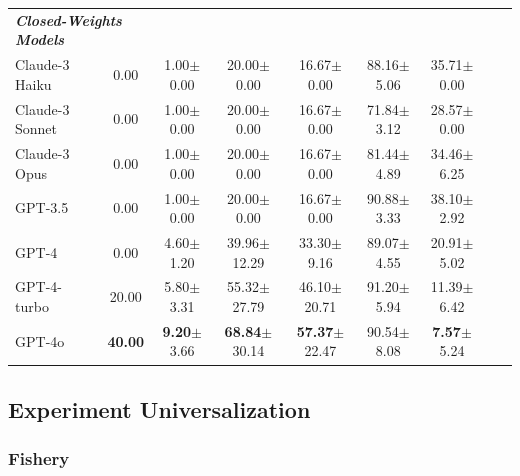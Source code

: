 \documentclass{article}
\newcommand{\fishScenarioFull}{Fishery\xspace}
\begin{document}
\begin{table}[h]
\begin{tabular}{lcccccccc}
\midrule
\multicolumn{2}{l}{\textbf{\textit{Closed-Weights Models}}}\\
Claude-3 Haiku & 0.00 & 1.00\tiny{$\pm$0.00} & 20.00\tiny{$\pm$0.00} & 16.67\tiny{$\pm$0.00} & 88.16\tiny{$\pm$5.06} & 35.71\tiny{$\pm$0.00} \\
Claude-3 Sonnet & 0.00 & 1.00\tiny{$\pm$0.00} & 20.00\tiny{$\pm$0.00} & 16.67\tiny{$\pm$0.00} & 71.84\tiny{$\pm$3.12} & 28.57\tiny{$\pm$0.00} \\
Claude-3 Opus & 0.00 & 1.00\tiny{$\pm$0.00} & 20.00\tiny{$\pm$0.00} & 16.67\tiny{$\pm$0.00} & 81.44\tiny{$\pm$4.89} & 34.46\tiny{$\pm$6.25} \\
GPT-3.5 & 0.00 & 1.00\tiny{$\pm$0.00} & 20.00\tiny{$\pm$0.00} & 16.67\tiny{$\pm$0.00} & 90.88\tiny{$\pm$3.33} & 38.10\tiny{$\pm$2.92} \\
GPT-4 & 0.00 & 4.60\tiny{$\pm$1.20} & 39.96\tiny{$\pm$12.29} & 33.30\tiny{$\pm$9.16} & 89.07\tiny{$\pm$4.55} & 20.91\tiny{$\pm$5.02} \\
GPT-4-turbo & 20.00 & 5.80\tiny{$\pm$3.31} & 55.32\tiny{$\pm$27.79} & 46.10\tiny{$\pm$20.71} & 91.20\tiny{$\pm$5.94} & 11.39\tiny{$\pm$6.42} \\
GPT-4o & \textbf{40.00} & \textbf{9.20}\tiny{$\pm$3.66} & \textbf{68.84}\tiny{$\pm$30.14} & \textbf{57.37}\tiny{$\pm$22.47} & 90.54\tiny{$\pm$8.08} & \textbf{7.57}\tiny{$\pm$5.24} \\
\bottomrule
\end{tabular}

\end{table}

\clearpage


\subsection{Experiment Universalization}
\label{app:details_results_universalization}





%
%


\subsubsection{\fishScenarioFull}

%
\end{document}
